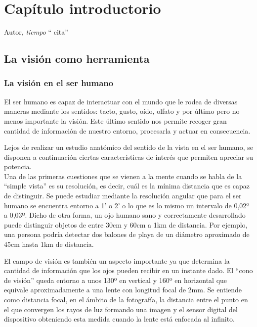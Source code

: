 \chapter{ Capítulo introductorio}

\begin{chapquote}{Autor, \textit{tiempo}}
`` cita''
\end{chapquote}


\iffalse
\section{La visión como herramienta}
\subsection{La visión en el ser humano}
El ser humano es capaz de interactuar con el mundo que le rodea de diversas maneras mediante los sentidos: tacto, gusto, oído, olfato y por último pero no menos importante la visión. Este último sentido nos permite recoger gran cantidad de información de nuestro entorno, procesarla y actuar en consecuencia. 

Lejos de realizar un estudio anatómico del sentido de la vista en el ser humano, se disponen a continuación ciertas características de interés que permiten apreciar su potencia.
\\
Una de las primeras cuestiones que se vienen a la mente cuando se habla de la ``simple vista'' es su resolución, es decir, cuál es la mínima distancia que es capaz de distinguir. Se puede estudiar mediante la resolución angular que para el ser humano se encuentra entorno a 1' o 2' o lo que es lo mismo un intervalo de 0,02º a 0,03º\cite{simple_vista}. Dicho de otra forma, un ojo humano sano y correctamente desarrollado puede distinguir objetos de entre 30cm y 60cm a 1km de distancia. Por ejemplo, una persona podría detectar dos balones de playa de un diámetro aproximado de 45cm hasta 1km de distancia.


El campo de visión es también un aspecto importante ya que determina la cantidad de información que los ojos pueden recibir en un instante dado. El ``cono de visión'' queda entorno a unos 130º en vertical y 160º en horizontal que equivale aproximadamente a una lente con longitud focal de 2mm\cite{angle_of_view}. Se entiende como distancia focal, en el ámbito de la fotografía, la distancia entre el punto en el que convergen los rayos de luz formando una imagen y el sensor digital del dispositivo obteniendo esta medida cuando la lente está enfocada al infinito.

